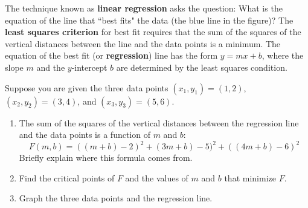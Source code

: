 \documentclass[%
]{article}
\begin{document}
\begin{enumerate}
The technique known as \textbf{linear regression} asks the question: What is the equation of the line that ``best fits" the data (the blue line in the figure)?  The \textbf{least squares criterion} for best fit requires that the sum of the squares of the vertical distances between the line and the data points is a minimum.  The equation of the best fit (or \textbf{regression}) line has the form $y=mx+b$, where the slope $m$ and the $y$-intercept $b$ are determined by the least squares condition.

Suppose you are given the three data points $(x_1,y_1)=(1,2)$, $(x_2,y_2)=(3,4)$, and $(x_3,y_3)=(5,6)$.
\begin{enumerate}
	\item The sum of the squares of the vertical distances between the regression line and the data points is a function of $m$ and $b$:
	\[
	F(m,b)=((m+b)-2)^2+(3m+b)-5)^2+((4m+b)-6)^2
	\]
	Briefly explain where this formula comes from.
	\item Find the critical points of $F$ and the values of $m$ and $b$ that minimize $F$.
	\item Graph the three data points and the regression line.
\end{enumerate}



\end{enumerate}
\end{document}
